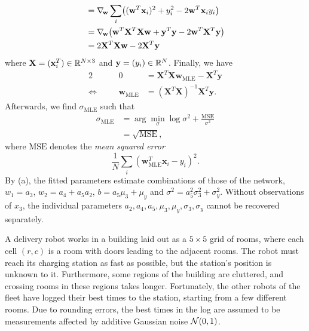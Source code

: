 \documentclass[11pt, a4paper]{exam}
\begin{document}
\begin{exercises}
\begin{parts}
\begin{solution}
\begin{align*}
            & = \nabla_{\!\mathbf{w}} \sum_i \rbk*{(\mathbf{w}^T \mathbf{x}_i)^2 + y_i^2 - 2 \mathbf{w}^T \mathbf{x}_i y_i} \\
            & = \nabla_{\!\mathbf{w}} \rbk*{\mathbf{w}^T \mathbf{X}^T \mathbf{X} \mathbf{w} + \mathbf{y}^T \mathbf{y} - 2 \mathbf{w}^T \mathbf{X}^T \mathbf{y}} \\
            & = 2 \mathbf{X}^T \mathbf{X} \mathbf{w} - 2 \mathbf{X}^T \mathbf{y}
        \end{align*}
        where $\mathbf{X} = (\mathbf{x}_i^T) \in \mathbb{R}^{N \times 3}$ and $\mathbf{y} = (y_i) \in \mathbb{R}^{N}$. Finally, we have
        \begin{alignat*}{2}
            && 0 & = \mathbf{X}^T \mathbf{X} \mathbf{w}_{\text{MLE}} - \mathbf{X}^T \mathbf{y} \\
            \Leftrightarrow \quad && \mathbf{w}_{\text{MLE}} & = (\mathbf{X}^T \mathbf{X})^{-1} \mathbf{X}^T \mathbf{y} .
        \end{alignat*}
        Afterwards, we find $\sigma_{\text{MLE}}$ such that
        \begin{align*}
            \sigma_{\text{MLE}} & = \arg \min_\sigma \log \sigma^2 + \frac{\text{MSE}}{\sigma^2} \\
            & = \sqrt{\text{MSE}},
        \end{align*}
        where $\text{MSE}$ denotes the \emph{mean squared error}
        \begin{equation*}
            \frac{1}{N} \sum_i (\mathbf{w}_{\text{MLE}}^T \mathbf{x}_i - y_i)^2 .
        \end{equation*}
        By (a), the fitted parameters estimate combinations of those of the network, $w_1 = a_3$, $w_2 = a_4 + a_5 a_2$, $b = a_5 \mu_3 + \mu_y$ and $\sigma^2 = a_5^2 \sigma_3^2 + \sigma_y^2$. Without observations of $x_3$, the individual parameters $a_2, a_4, a_5, \mu_3, \mu_y, \sigma_3, \sigma_y$ cannot be recovered separately.
    \end{solution}
\end{parts}


A delivery robot works in a building laid out as a $5 \times 5$ grid of rooms, where each cell $(r, c)$ is a room with doors leading to the adjacent rooms. The robot must reach its charging station as fast as possible, but the station's position is unknown to it. Furthermore, some regions of the building are cluttered, and crossing rooms in these regions takes longer. Fortunately, the other robots of the fleet have logged their best times to the station, starting from a few different rooms. Due to rounding errors, the best times in the log are assumed to be measurements affected by additive Gaussian noise $\mathcal{N}(0, 1)$.


\end{exercises}
\end{document}
